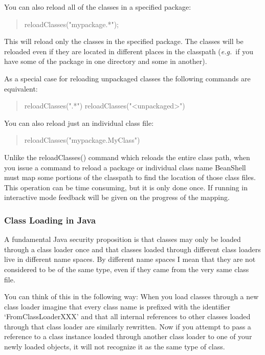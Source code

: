 \documentclass[twoside,11pt,nolof]{starlink}
\providecommand{\eg}{\textit{e.g.}}
\begin{document}
You can also reload all of the classes in a specified package:
\begin{quote}
\begin{terminalv}
    reloadClasses("mypackage.*");
\end{terminalv}
\end{quote}

This will reload only the classes in the specified package.  The
classes will be reloaded even if they are located in different places
in the classpath (\eg\  if you have some of the package in one
directory and some in another).

As a special case for reloading unpackaged classes the following
commands are equivalent:
\begin{quote}
\begin{terminalv}
    reloadClasses(".*")
    reloadClasses("<unpackaged>")
\end{terminalv}
\end{quote}

You can also reload just an individual class file:
\begin{quote}
\begin{terminalv}
    reloadClasses("mypackage.MyClass")
\end{terminalv}
\end{quote}

Unlike the reloadClasses() command which reloads the entire class path,
when you issue a command to reload a package or individual class name
BeanShell must map some portions of the classpath to find the location
of those class files.  This operation can be time consuming, but it is
only done once.  If running in interactive mode feedback will be given
on the progress of the mapping.

\subsubsection{Class Loading in Java}

A fundamental Java security proposition is that classes may only be
loaded through a class loader once and that classes loaded through
different class loaders live in different name spaces.  By different
name spaces I mean that they are not considered to be of the same
type, even if they came from the very same class file.

You can think of this in the following way: When you load classes
through a new class loader imagine that every class name is prefixed
with the identifier `FromClassLoaderXXX' and that all internal
references to other classes loaded through that class loader are
similarly rewritten.  Now if you attempt to pass a reference to a
class instance loaded through another class loader to one of your
newly loaded objects, it will not recognize it as the same type of
class.
\end{document}
